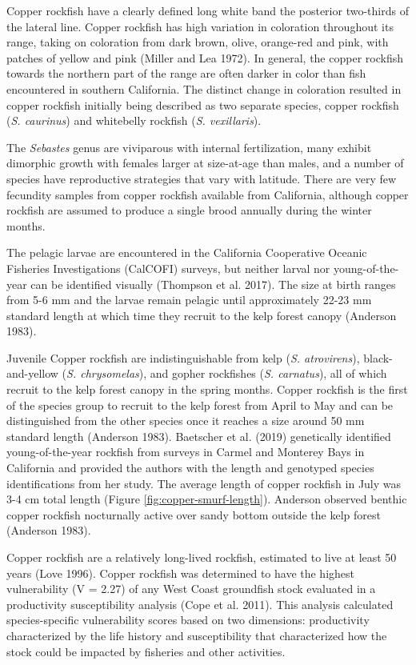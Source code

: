 \documentclass[11pt,
  english,
  letterpaper,
]{article}
\begin{document}
Copper rockfish have a clearly defined long white band the posterior two-thirds of the lateral line. Copper rockfish has high variation in coloration throughout its range, taking on coloration from dark brown, olive, orange-red and pink, with patches of yellow and pink (Miller and Lea 1972). In general, the copper rockfish towards the northern part of the range are often darker in color than fish encountered in southern California. The distinct change in coloration resulted in copper rockfish initially being described as two separate species, copper rockfish (\emph{S. caurinus}) and whitebelly rockfish (\emph{S. vexillaris}).

The \emph{Sebastes} genus are viviparous with internal fertilization, many exhibit dimorphic growth with females larger at size-at-age than males, and a number of species have reproductive strategies that vary with latitude. There are very few fecundity samples from copper rockfish available from California, although copper rockfish are assumed to produce a single brood annually during the winter months.

The pelagic larvae are encountered in the California Cooperative Oceanic Fisheries Investigations (CalCOFI) surveys, but neither larval nor young-of-the-year can be identified visually (Thompson et al. 2017). The size at birth ranges from 5-6 mm and the larvae remain pelagic until approximately 22-23 mm standard length at which time they recruit to the kelp forest canopy (Anderson 1983).

Juvenile Copper rockfish are indistinguishable from kelp (\emph{S. atrovirens}), black-and-yellow (\emph{S. chrysomelas}), and gopher rockfishes (\emph{S. carnatus}), all of which recruit to the kelp forest canopy in the spring months. Copper rockfish is the first of the species group to recruit to the kelp forest from April to May and can be distinguished from the other species once it reaches a size around 50 mm standard length (Anderson 1983). Baetscher et al. (2019) genetically identified young-of-the-year rockfish from surveys in Carmel and Monterey Bays in California and provided the authors with the length and genotyped species identifications from her study. The average length of copper rockfish in July was 3-4 cm total length (Figure \ref{fig:copper-smurf-length}). Anderson observed benthic copper rockfish nocturnally active over sandy bottom outside the kelp forest (Anderson 1983).

Copper rockfish are a relatively long-lived rockfish, estimated to live at least 50 years (Love 1996). Copper rockfish was determined to have the highest vulnerability (V = 2.27) of any West Coast groundfish stock evaluated in a productivity susceptibility analysis (Cope et al. 2011). This analysis calculated species-specific vulnerability scores based on two dimensions: productivity characterized by the life history and susceptibility that characterized how the stock could be impacted by fisheries and other activities.
\end{document}

